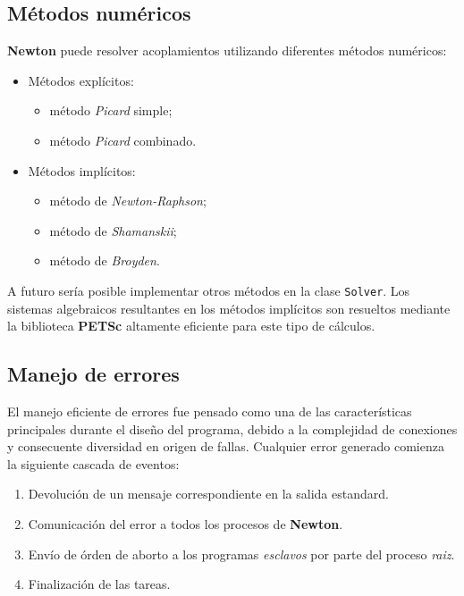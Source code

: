 \subsection*{Métodos numéricos}
\label{ap2:num-met}

\textbf{Newton} puede resolver acoplamientos utilizando diferentes métodos numéricos:
\begin{itemize}
\item Métodos explícitos:
\begin{itemize}
\item método \textit{Picard} simple;
\item método \textit{Picard} combinado.
\end{itemize}
\item Métodos implícitos:
\begin{itemize}
\item método de \textit{Newton-Raphson};
\item método de \textit{Shamanskii};
\item método de \textit{Broyden}.
\end{itemize}
\end{itemize}
A futuro sería posible implementar otros métodos en la clase \texttt{Solver}.
Los sistemas algebraicos resultantes en los métodos implícitos son resueltos mediante la biblioteca \textbf{PETSc} \cite{petsc-web-page} altamente eficiente para este tipo de cálculos.

\subsection*{Manejo de errores}
\label{ap2:error}

El manejo eficiente de errores fue pensado como una de las características principales durante el diseño del programa,
debido a la complejidad de conexiones y consecuente diversidad en origen de fallas.
Cualquier error generado comienza la siguiente cascada de eventos:
\begin{enumerate}
\item Devolución de un mensaje correspondiente en la salida estandard.
\item Comunicación del error a todos los procesos de \textbf{Newton}.
\item Envío de órden de aborto a los programas \textit{esclavos} por parte del proceso \textit{raiz}.
\item Finalización de las tareas.
\end{enumerate}

